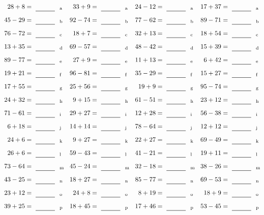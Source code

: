 \documentclass
[
  draft    = true,
  fontsize = 11pt,
  parskip  = half-
]
{scrartcl}
\begin{document}
\clearpage
\begin{align*}
    \pline{28+8}&=\rline{a}
  & \pline{33+9}&=\rline{a}
  & \pline{24-12}&=\rline{a}
  & \pline{17+37}&=\rline{a} \\[1ex]
    \pline{45-29}&=\rline{b}
  & \pline{92-74}&=\rline{b}
  & \pline{77-62}&=\rline{b}
  & \pline{89-71}&=\rline{b} \\[1ex]
    \pline{76-72}&=\rline{c}
  & \pline{18+7}&=\rline{c}
  & \pline{32+13}&=\rline{c}
  & \pline{18+54}&=\rline{c} \\[1ex]
    \pline{13+35}&=\rline{d}
  & \pline{69-57}&=\rline{d}
  & \pline{48-42}&=\rline{d}
  & \pline{15+39}&=\rline{d} \\[1ex]
    \pline{89-77}&=\rline{e}
  & \pline{27+9}&=\rline{e}
  & \pline{11+13}&=\rline{e}
  & \pline{6+42}&=\rline{e} \\[1ex]
    \pline{19+21}&=\rline{f}
  & \pline{96-81}&=\rline{f}
  & \pline{35-29}&=\rline{f}
  & \pline{15+27}&=\rline{f} \\[1ex]
    \pline{17+55}&=\rline{g}
  & \pline{25+56}&=\rline{g}
  & \pline{19+9}&=\rline{g}
  & \pline{95-74}&=\rline{g} \\[1ex]
    \pline{24+32}&=\rline{h}
  & \pline{9+15}&=\rline{h}
  & \pline{61-51}&=\rline{h}
  & \pline{23+12}&=\rline{h} \\[1ex]
    \pline{71-61}&=\rline{i}
  & \pline{29+27}&=\rline{i}
  & \pline{12+28}&=\rline{i}
  & \pline{56-38}&=\rline{i} \\[1ex]
    \pline{6+18}&=\rline{j}
  & \pline{14+14}&=\rline{j}
  & \pline{78-64}&=\rline{j}
  & \pline{12+12}&=\rline{j} \\[1ex]
    \pline{24+6}&=\rline{k}
  & \pline{9+27}&=\rline{k}
  & \pline{22+27}&=\rline{k}
  & \pline{69-49}&=\rline{k} \\[1ex]
    \pline{26+6}&=\rline{l}
  & \pline{59-43}&=\rline{l}
  & \pline{41-21}&=\rline{l}
  & \pline{19+11}&=\rline{l} \\[1ex]
    \pline{73-64}&=\rline{m}
  & \pline{45-24}&=\rline{m}
  & \pline{32-18}&=\rline{m}
  & \pline{38-26}&=\rline{m} \\[1ex]
    \pline{43-25}&=\rline{n}
  & \pline{18+27}&=\rline{n}
  & \pline{85-77}&=\rline{n}
  & \pline{69-53}&=\rline{n} \\[1ex]
    \pline{23+12}&=\rline{o}
  & \pline{24+8}&=\rline{o}
  & \pline{8+19}&=\rline{o}
  & \pline{18+9}&=\rline{o} \\[1ex]
    \pline{39+25}&=\rline{p}
  & \pline{18+45}&=\rline{p}
  & \pline{17+46}&=\rline{p}
  & \pline{53-45}&=\rline{p}
\end{align*}
\end{document}
